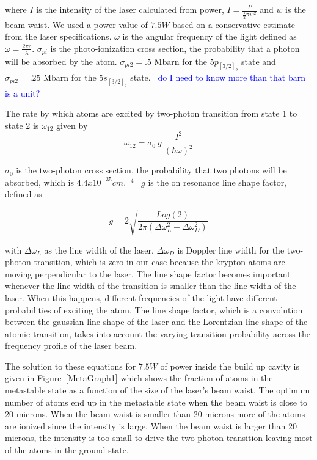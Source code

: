 \documentclass[prb,preprint]{revtex4-1}
\begin{document}
where $I$ is the intensity of the laser calculated from power, $I = \frac{P}{\frac{1}{2}\pi w^2}$ and $w$ is the beam waist. We used a power value of $7.5 W$ based on a conservative estimate from the laser specifications. $\omega$ is the angular frequency of the light defined as $\omega = \frac{2\pi c}{\lambda}$. $\sigma_{pi}$ is the photo-ionization cross section, the probability that a photon will be absorbed by the atom. $\sigma_{pi2} = .5$ Mbarn for the $5p_{[3/2]_2}$ state and $\sigma_{pi2} = .25$ Mbarn for the $5s_{[3/2]_2}$ state.~\cite{Cannon} \textcolor{blue}{do I need to know more than that barn is a unit?}

The rate by which atoms are excited by two-photon transition from state 1 to state 2 is $\omega_{12}$ given by
\begin{equation}
\label{ExcitationRate}
\omega_{12} = \sigma_0\ g\ \frac{I^2}{(\hbar \omega)^2}
\end{equation}

$\sigma_0$ is the two-photon cross section, the probability that two photons will be absorbed, which is $4.4x10^{-35} cm.^{-4}$~\cite{NIST} $g$ is the on resonance line shape factor, defined as 

\begin{equation}
\label{LineShapeFactor}
g = 2 \sqrt{\frac{Log(2)}{2 \pi (\Delta \omega_L^2 + \Delta \omega_D^2)}}
\end{equation}

with $\Delta\omega_L$ as the line width of the laser. $\Delta \omega_D$ is Doppler line width for the two-photon transition, which is zero in our case because the krypton atoms are moving perpendicular to the laser.  The line shape factor becomes important whenever the line width of the transition is smaller than the line width of the laser.  When this happens, different frequencies of the light have different probabilities of exciting the atom.  The line shape factor, which is a convolution between the gaussian line shape of the laser and the Lorentzian line shape of the atomic transition, takes into account the varying transition probability across the frequency profile of the laser beam. 

The solution to these equations for $7.5 W$ of power inside the build up cavity is given in Figure~\ref{MetaGraph1} which shows the fraction of atoms in the metastable state as a function of the size of the laser's beam waist. The optimum number of atoms end up in the metastable state when the beam waist is close to 20 microns. When the beam waist is smaller than 20 microns more of the atoms are ionized since the intensity is large. When the beam waist is larger than 20 microns, the intensity is too small to drive the two-photon transition leaving most of the atoms in the ground state.
\end{document}

